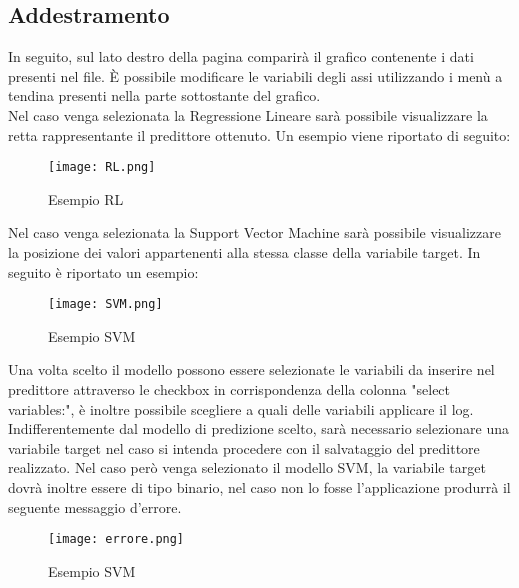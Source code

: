 \documentclass[../manuale-utente.tex]{subfiles}
\begin{document}
\newpage
\subsection{Addestramento}
\label{subs:addestramento}

In seguito, sul lato destro della pagina comparirà il grafico contenente i dati presenti nel file. È possibile modificare le variabili degli assi utilizzando i menù a tendina presenti nella parte sottostante del grafico.\\
Nel caso venga selezionata la Regressione Lineare sarà possibile visualizzare la retta rappresentante il predittore ottenuto. Un esempio viene riportato di seguito:

\begin{figure}[h!]
  \begin{center}
    \texttt{[image: RL.png]}\\
    \caption{Esempio RL}%
    \label{fig:RL}
  \end{center}
  \end{figure}


\newpage
Nel caso venga selezionata la Support Vector Machine sarà possibile visualizzare la posizione dei valori appartenenti alla stessa classe della variabile target. In seguito è riportato un esempio:

  \begin{figure}[h!]
    \begin{center}
      \texttt{[image: SVM.png]}\\
      \caption{Esempio SVM}%
      \label{fig:SVM}
    \end{center}
    \end{figure}

\newpage
Una volta scelto il modello possono essere selezionate le variabili da inserire nel predittore attraverso le checkbox in corrispondenza della colonna "select variables:", è inoltre possibile scegliere a quali delle variabili applicare il log.
Indifferentemente dal modello di predizione scelto, sarà necessario selezionare una variabile target nel caso si intenda procedere con il salvataggio del predittore realizzato.
Nel caso però venga selezionato il modello SVM, la variabile target dovrà inoltre essere di tipo binario, nel caso non lo fosse l'applicazione produrrà il seguente messaggio d'errore.

\begin{figure}[h!]
  \begin{center}
    \texttt{[image: errore.png]}\\
    \caption{Esempio SVM}%
    \label{fig:SVM}
  \end{center}
  \end{figure}
\end{document}
